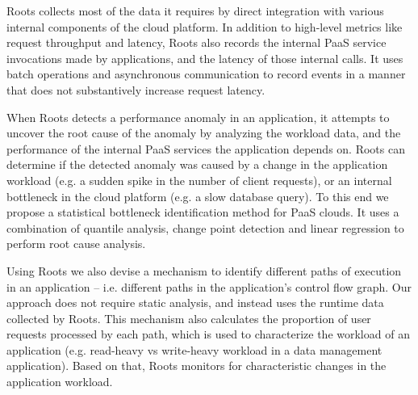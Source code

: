 Roots collects most of the data it requires by direct integration with various internal components 
of the cloud platform. In addition to high-level metrics like request throughput
and latency, Roots also records the internal PaaS service invocations made by applications,
and the latency of those internal calls. It uses batch operations and asynchronous 
communication to record events in a manner that does not substantively
increase request latency.

When Roots detects a performance anomaly in an application, it attempts to uncover the
root cause of the anomaly by analyzing the workload data,
and the performance of the internal PaaS services the application depends on. 
Roots can determine if the detected anomaly was caused by a change in the
application workload (e.g. a sudden spike in the number of client requests), or an internal
bottleneck in the cloud platform (e.g. a slow database query). To this end we propose
a statistical bottleneck identification method for PaaS clouds. 
It uses a combination of quantile analysis, change point detection
and linear regression to perform root cause analysis. 

Using Roots we also devise a mechanism to identify different paths of execution in
an application -- i.e. different paths in the application's control flow graph. 
Our approach does not require static analysis, and instead uses the 
runtime data collected by Roots. This mechanism also calculates the proportion of 
user requests processed by each path, which is used to characterize the workload
of an application (e.g. read-heavy vs write-heavy workload in a data management
application). Based on that, Roots monitors for characteristic changes in the application
workload.

